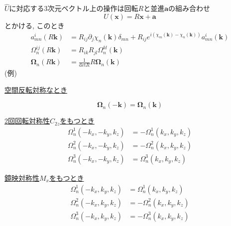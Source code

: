 \begin{theotcolorbox}[title = 時間反転を含まない操作$\hat{U}$で対称なとき]
    $\hat{U}$に対応する3次元ベクトル上の操作は回転$R$と並進$\bm{a}$の組み合わせ
    \begin{equation*}
        U(\bm{x}) = R\bm{x} + \bm{a}
    \end{equation*}
    とかける, このとき
    \begin{align*}
        a^{i}_{mn}(R \bm{k}) & = R_{ij} \partial_j \chi_n(\bm{k}) \delta_{mn} + R_{ij} e^{i(\chi_m(\bm{k}) - \chi_n(\bm{k}))} a^i_{mn} (\bm{k})\\
        \Omega^{ij}_n(R\bm{k}) & = R_{ik} R_{jl} \Omega^{kl}_n(\bm{k})\\
        \bm{\Omega}_n (R \bm{k}) & = \frac{1}{\mathrm{det}{R}} R \bm{\Omega}_n (\bm{k})
    \end{align*}
    {\Large (例)}

    {\large \uline{空間反転対称なとき}}

    \begin{equation*}
        \bm{\Omega}_n ( - \bm{k}) = \bm{\Omega}_n (\bm{k})
    \end{equation*}

    {\large \uline{2回回転対称性$C_{2z}$をもつとき}}
    \begin{align*}
        \Omega_n^1 (-k_x,-k_y,k_z) & = - \Omega_n^1 (k_x,k_y,k_z)\\
        \Omega_n^2 (-k_x,-k_y,k_z) & = - \Omega_n^2 (k_x,k_y,k_z)\\
        \Omega_n^3 (-k_x,-k_y,k_z) & = \Omega_n^3 (k_x,k_y,k_z)
    \end{align*}

    {\large \uline{鏡映対称性$M_x$をもつとき}}
    \begin{align*}
        \Omega_n^1 (-k_x,k_y,k_z) & = \Omega_n^1 (k_x,k_y,k_z)\\
        \Omega_n^2 (-k_x,k_y,k_z) & = - \Omega_n^2 (k_x,k_y,k_z)\\
        \Omega_n^3 (-k_x,k_y,k_z) & = - \Omega_n^3 (k_x,k_y,k_z)
    \end{align*}
\end{theotcolorbox}

